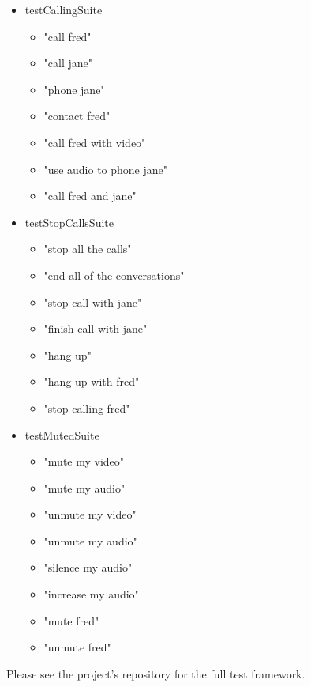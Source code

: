 \documentclass[11pt]{article}
\begin{document}
\begin{scriptsize}
\begin{itemize}
\item testCallingSuite
	\begin{itemize}
	\item "call fred"
	\item "call jane"
	\item "phone jane"
	\item "contact fred"
	\item "call fred with video"
	\item "use audio to phone jane"
	\item "call fred and jane"
	\end{itemize}
\item testStopCallsSuite
	\begin{itemize}
	\item "stop all the calls"
	\item "end all of the conversations"
	\item "stop call with jane"
	\item "finish call with jane"
	\item "hang up"
	\item "hang up with fred"
	\item "stop calling fred"
	\end{itemize}
\item testMutedSuite
	\begin{itemize}
	\item "mute my video"
	\item "mute my audio"
	\item "unmute my video"
	\item "unmute my audio"
	\item "silence my audio"
	\item "increase my audio"
	\item "mute fred"
	\item "unmute fred"
	\end{itemize}	
\end{itemize}
\end{scriptsize}

Please see the project's repository for the full test framework.

\newpage
{}

\end{document}
